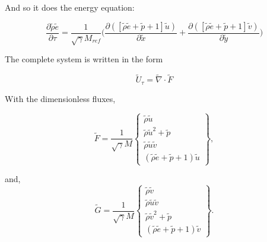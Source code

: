 \documentclass[10pt,a4paper]{article}
\begin{document}
And so it does the energy equation:

\begin{equation}
\frac{\partial \tilde{\rho}\tilde{e}}{\partial \tau} = \frac{1}{\sqrt{\gamma}M_{ref}}\biggl( \frac{\partial ([\tilde{\rho}\tilde{e} + \tilde{p}+1]\tilde{u}) }{\partial \tilde{x}}+\frac{\partial ([\tilde{\rho}\tilde{e} + \tilde{p}+1]\tilde{v})  }{\partial \tilde{y}}\biggr)
\end{equation}


The complete system is written in the form

\begin{equation}
\tilde{U}_\tau = \tilde{\nabla}\cdot \tilde{F}	
\end{equation}

With the dimensionless fluxes,

\begin{equation}
\tilde{F} =\frac{1}{\sqrt{\gamma}M}\left\{\begin{array}{c} \tilde{\rho}\tilde{u} \\ \tilde{\rho}\tilde{u}^2 + \tilde{p} \\ \tilde{\rho}\tilde{u}\tilde{v} \\ (\tilde{\rho}\tilde{e} + \tilde{p} + 1)\tilde{u}\end{array}\right\},
\end{equation}

and, 
\begin{equation}
\tilde{G} =\frac{1}{\sqrt{\gamma}M}\left\{\begin{array}{c} \tilde{\rho}\tilde{v} \\\tilde{\rho}\tilde{u}\tilde{v} \\ \tilde{\rho}\tilde{v}^2 + \tilde{p}  \\ (\tilde{\rho}\tilde{e} + \tilde{p} + 1)\tilde{v}\end{array}\right\}.
\end{equation}
\end{document}
